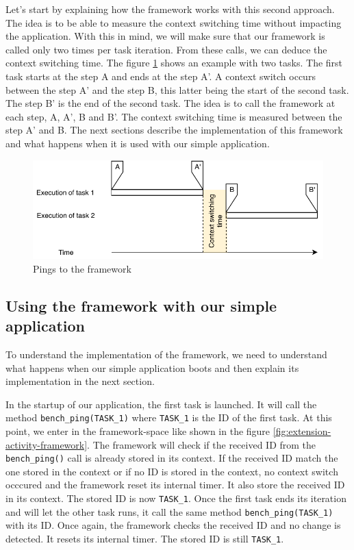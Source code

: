 Let's start by explaining how the framework works with this second approach.
The idea is to be able to measure the context switching time without impacting the application.
With this in mind, we will make sure that our framework is called only two times per task iteration.
From these calls, we can deduce the context switching time.
The figure \ref{fig:internal-framework-ping} shows an example with two tasks.
The first task starts at the step A and ends at the step A'.
A context switch occurs between the step A' and the step B, this latter being the start of the second task.
The step B' is the end of the second task.
The idea is to call the framework at each step, A, A', B and B'.
The context switching time is measured between the step A' and B.
The next sections describe the implementation of this framework and what happens when it is used with our simple application.

\begin{figure}[!ht]
  \centering
  \includegraphics[scale=1]{assets/internal-framework-ping.pdf}
  \caption{\label{fig:internal-framework-ping}Pings to the framework}
\end{figure}

\subsection{Using the framework with our simple application}

To understand the implementation of the framework, we need to understand what happens when our simple application boots and then explain its implementation in the next section.

In the startup of our application, the first task is launched.
It will call the method \texttt{bench\_ping(TASK\_1)} where \texttt{TASK\_1} is the ID of the first task.
At this point, we enter in the framework-space like shown in the figure \ref{fig:extension-activity-framework}.
The framework will check if the received ID from the \texttt{bench\_ping()} call is already stored in its context.
If the received ID match the one stored in the context or if no ID is stored in the context, no context switch occcured and the framework reset its internal timer.
It also store the received ID in its context.
The stored ID is now \texttt{TASK\_1}.
Once the first task ends its iteration and will let the other task runs, it call the same method \texttt{bench\_ping(TASK\_1)} with its ID.
Once again, the framework checks the received ID and no change is detected.
It resets its internal timer.
The stored ID is still \texttt{TASK\_1}.

